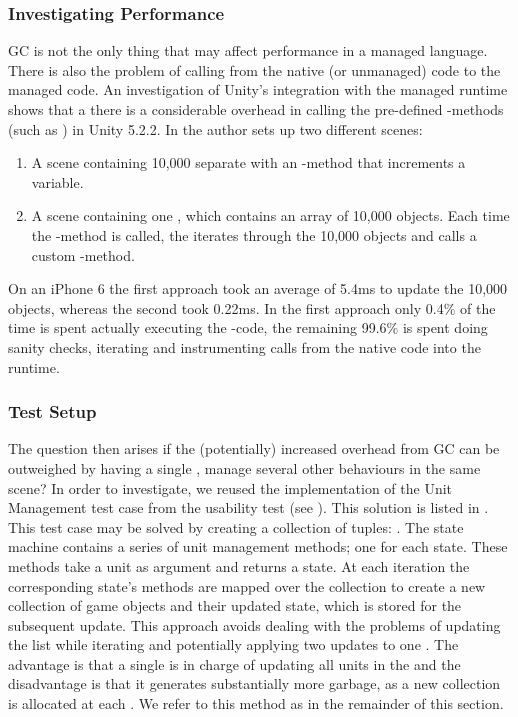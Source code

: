 \subsubsection{Investigating Performance}
\gls{GC} is not the only thing that may affect performance in a managed language. There is also the problem of calling from the native (or unmanaged) code to the managed code. An investigation of Unity's integration with the managed runtime shows that a there is a considerable overhead in calling the pre-defined -methods (such as ) in Unity 5.2.2\cite{unity:runtime:calls}. In \cite{unity:runtime:calls} the author sets up two different scenes:
\begin{enumerate}
    \item A scene containing 10,000 separate  with an -method that increments a variable.
    \item A scene containing one , which contains an array of 10,000 objects. Each time the -method is called, the  iterates through the 10,000 objects and calls a custom -method.
\end{enumerate}
On an iPhone 6 the first approach took an average of 5.4ms to update the 10,000 objects, whereas the second took 0.22ms\cite{unity:runtime:calls}. In the first approach only 0.4\% of the time is spent actually executing the -code, the remaining 99.6\% is spent doing sanity checks, iterating  and instrumenting calls from the native code into the runtime.

\subsubsection{Test Setup}
The question then arises if the (potentially) increased overhead from \gls{GC} can be outweighed by having a single , manage several other behaviours in the same scene? In order to investigate, we reused the implementation of the Unit Management test case from the usability test (see ). This solution is listed in . This test case may be solved by creating a collection of tuples: . The state machine contains a series of unit management methods; one for each state. These methods take a unit as argument and returns a state. At each iteration the corresponding state's methods are mapped over the collection to create a new collection of game objects and their updated state, which is stored for the subsequent update. This approach avoids dealing with the problems of updating the list while iterating and potentially applying two updates to one . The advantage is that a single  is in charge of updating all units in the  and the disadvantage is that it generates substantially more garbage, as a new collection is allocated at each . We refer to this method as  in the remainder of this section.


